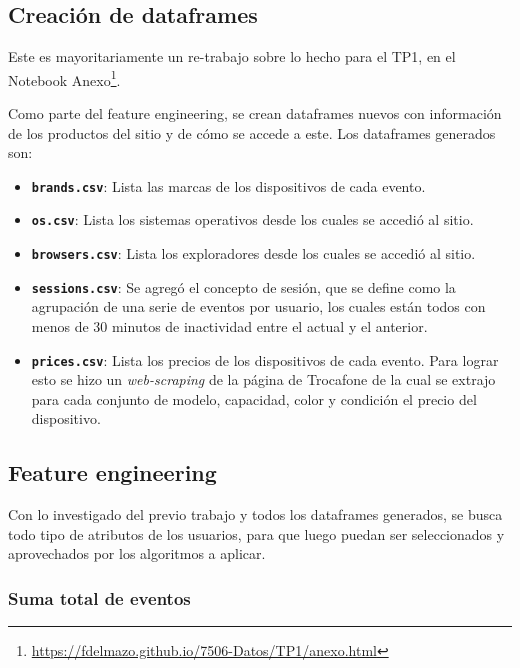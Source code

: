 \documentclass[a4paper]{article}
\begin{document}
\subsection{Creación de dataframes}

Este es mayoritariamente un re-trabajo sobre lo hecho para el TP1, en el Notebook Anexo\footnote{\url{https://fdelmazo.github.io/7506-Datos/TP1/anexo.html}}.

Como parte del feature engineering, se crean dataframes nuevos con información de los productos del sitio y de cómo se accede a este. Los dataframes generados son:

\begin{itemize}
	\item \textbf{\texttt{brands.csv}}: Lista las marcas de los dispositivos de cada evento.
	\item \textbf{\texttt{os.csv}}: Lista los sistemas operativos desde los cuales se accedió al sitio.
	\item \textbf{\texttt{browsers.csv}}: Lista los exploradores desde los cuales se accedió al sitio.
	\item \textbf{\texttt{sessions.csv}}:  Se agregó el concepto de sesión, que se define como la agrupación de una serie de eventos por usuario, los cuales están todos con menos de 30 minutos de inactividad entre el actual y el anterior. 
	\item \textbf{\texttt{prices.csv}}: Lista los precios de los dispositivos de cada evento. Para lograr esto se hizo un \textit{web-scraping} de la página de Trocafone de la cual se extrajo para cada conjunto de modelo, capacidad, color y condición el precio del dispositivo.
\end{itemize}

\subsection{Feature engineering}

Con lo investigado del previo trabajo y todos los dataframes generados, se busca todo tipo de atributos de los usuarios, para que luego puedan ser seleccionados y aprovechados por los algoritmos a aplicar.

\subsubsection{Suma total de eventos}

\begin{sloppypar}
\texttt{}
\end{sloppypar}
\end{document}

